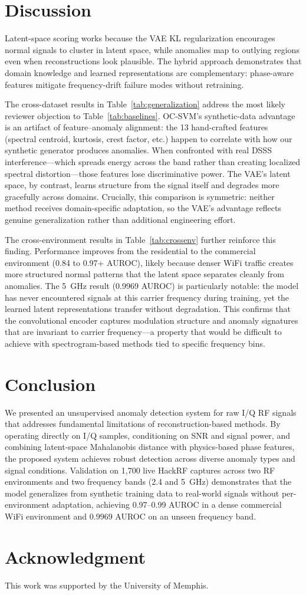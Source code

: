 \documentclass[conference]{IEEEtran}
\begin{document}
\section{Discussion}
Latent-space scoring works because the VAE KL regularization encourages normal signals to cluster in latent space, while anomalies map to outlying regions even when reconstructions look plausible. The hybrid approach demonstrates that domain knowledge and learned representations are complementary: phase-aware features mitigate frequency-drift failure modes without retraining.

The cross-dataset results in Table~\ref{tab:generalization} address the most likely reviewer objection to Table~\ref{tab:baselines}. OC-SVM's synthetic-data advantage is an artifact of feature--anomaly alignment: the 13 hand-crafted features (spectral centroid, kurtosis, crest factor, etc.) happen to correlate with how our synthetic generator produces anomalies. When confronted with real DSSS interference---which spreads energy across the band rather than creating localized spectral distortion---those features lose discriminative power. The VAE's latent space, by contrast, learns structure from the signal itself and degrades more gracefully across domains. Crucially, this comparison is symmetric: neither method receives domain-specific adaptation, so the VAE's advantage reflects genuine generalization rather than additional engineering effort.

The cross-environment results in Table~\ref{tab:crossenv} further reinforce this finding. Performance improves from the residential to the commercial environment (0.84 to 0.97+ AUROC), likely because denser WiFi traffic creates more structured normal patterns that the latent space separates cleanly from anomalies. The 5~GHz result (0.9969 AUROC) is particularly notable: the model has never encountered signals at this carrier frequency during training, yet the learned latent representations transfer without degradation. This confirms that the convolutional encoder captures modulation structure and anomaly signatures that are invariant to carrier frequency---a property that would be difficult to achieve with spectrogram-based methods tied to specific frequency bins.

\section{Conclusion}
We presented an unsupervised anomaly detection system for raw I/Q RF signals that addresses fundamental limitations of reconstruction-based methods. By operating directly on I/Q samples, conditioning on SNR and signal power, and combining latent-space Mahalanobis distance with physics-based phase features, the proposed system achieves robust detection across diverse anomaly types and signal conditions. Validation on 1{,}700 live HackRF captures across two RF environments and two frequency bands (2.4 and 5~GHz) demonstrates that the model generalizes from synthetic training data to real-world signals without per-environment adaptation, achieving 0.97--0.99 AUROC in a dense commercial WiFi environment and 0.9969 AUROC on an unseen frequency band.

\section*{Acknowledgment}
This work was supported by the University of Memphis.



\end{document}
